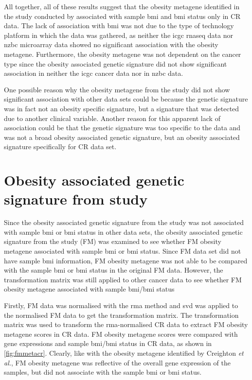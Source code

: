 All together, all of these results suggest that the obesity metagene identified in the study conducted by \citet{Creighton2012} associated with sample \gls{bmi} and \gls{bmi} status only in CR data.
The lack of association with \gls{bmi} was not due to the type of technology platform in which the data was gathered, as neither the \gls{icgc} \gls{rnaseq} data nor \gls{nzbc} microarray data showed no significant association with the obesity metagene.
Furthermore, the obesity metagene was not dependent on the cancer type since the obesity associated genetic signature did not show significant association in neither the \gls{icgc} cancer data nor in \gls{nzbc} data.

One possible reason why the obesity metagene from the \citet{Creighton2012} study did not show significant association with other data sets could be because the genetic signature was in fact not an obesity specific signature, but a signature that was detected due to another clinical variable.
Another reason for this apparent lack of association could be that the genetic signature was too specific to the data and was not a broad obesity associated genetic signature, but an obesity associated signature specifically for CR data set.

\section{Obesity associated genetic signature from \citet{Fuentes-Mattei2014} study}
\label{sec:fm_obesity_metagene}

Since the obesity associated genetic signature from the \citet{Creighton2012} study was not associated with sample \gls{bmi} or \gls{bmi} status in other data sets, the obesity associated genetic signature from the \citet{Fuentes-Mattei2014} study (FM) was examined to see whether FM obesity metagene associated with sample \gls{bmi} or \gls{bmi} status.
Since FM data set did not have sample \gls{bmi} information, FM obesity metagene was not able to be compared with the sample \gls{bmi} or \gls{bmi} status in the original FM data.
However, the transformation matrix was still applied to other cancer data to see whether FM obesity metagene associated with sample \gls{bmi}/\gls{bmi} status

Firstly, FM data was normalised with the \gls{rma} method and \gls{svd} was applied to the normalised FM data to get the transformation matrix.
The transformation matrix was used to transform the \gls{rma}-normalised CR data to extract FM obesity metagene scores in CR data.
FM obesity metagene scores were compared with gene expressions and sample \gls{bmi}/\gls{bmi} status in CR data, as shown in \cref{fig:fmmetacr}.
Clearly, like with the obesity metagene identified by Creighton \textit{et al.}, FM obesity metagene was reflective of the overall gene expression of the samples, but did not associate with the sample \gls{bmi} or \gls{bmi} status.

